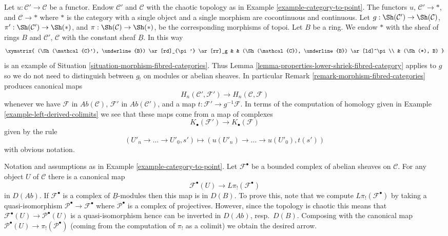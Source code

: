 \begin{example}
\label{example-morphism-categories}
Let $u : \mathcal{C}' \to \mathcal{C}$ be a functor.
Endow $\mathcal{C}'$ and $\mathcal{C}$ with the chaotic
topology as in Example \ref{example-category-to-point}.
The functors $u$, $\mathcal{C}' \to *$, and $\mathcal{C} \to *$
where $*$ is the category with a single object and a single morphism
are cocontinuous and continuous. Let
$g : \Sh(\mathcal{C}') \to \Sh(\mathcal{C})$,
$\pi' : \Sh(\mathcal{C}') \to \Sh(*)$, and
$\pi : \Sh(\mathcal{C}) \to \Sh(*)$,
be the corresponding morphisms of topoi.
Let $B$ be a ring. We endow $*$ with the sheaf of rings $B$ and
$\mathcal{C}'$, $\mathcal{C}$ with the constant sheaf $\underline{B}$.
In this way
$$
\xymatrix{
(\Sh(\mathcal{C}'), \underline{B}) \ar[rd]_{\pi'} \ar[rr]_g & &
(\Sh(\mathcal{C}), \underline{B}) \ar[ld]^\pi \\
& (\Sh(*), B)
}
$$
is an example of Situation \ref{situation-morphism-fibred-categories}.
Thus
Lemma \ref{lemma-properties-lower-shriek-fibred-category}
applies to $g$ so we do not need to distinguish between $g_!$ on
modules or abelian sheaves. In particular
Remark \ref{remark-morphism-fibred-categories}
produces canonical maps
$$
H_n(\mathcal{C}', \mathcal{F}')
\longrightarrow
H_n(\mathcal{C}, \mathcal{F})
$$
whenever we have $\mathcal{F}$ in $\textit{Ab}(\mathcal{C})$,
$\mathcal{F}'$ in $\textit{Ab}(\mathcal{C}')$,
and a map $t : \mathcal{F}' \to g^{-1}\mathcal{F}$. In terms of the
computation of homology given in
Example \ref{example-left-derived-colimits}
we see that these maps come from a map of complexes
$$
K_\bullet(\mathcal{F}') \longrightarrow K_\bullet(\mathcal{F})
$$
given by the rule
$$
(U'_n \to \ldots \to U'_0, s') \longmapsto
(u(U'_n) \to \ldots \to u(U'_0), t(s'))
$$
with obvious notation.
\end{example}

\begin{remark}
\label{remark-map-evaluation-to-derived}
Notation and assumptions as in Example \ref{example-category-to-point}.
Let $\mathcal{F}^\bullet$ be a bounded complex of abelian sheaves on
$\mathcal{C}$. For any object $U$ of $\mathcal{C}$ there is a canonical
map
$$
\mathcal{F}^\bullet(U) \longrightarrow L\pi_!(\mathcal{F}^\bullet)
$$
in $D(\textit{Ab})$. If $\mathcal{F}^\bullet$ is a complex of
$\underline{B}$-modules then this map is in $D(B)$. To prove this, note
that we compute $L\pi_!(\mathcal{F}^\bullet)$ by taking a quasi-isomorphism
$\mathcal{P}^\bullet \to \mathcal{F}^\bullet$ where $\mathcal{P}^\bullet$
is a complex of projectives. However, since the topology is chaotic
this means that $\mathcal{F}^\bullet(U) \to \mathcal{P}^\bullet(U)$
is a quasi-isomorphism hence can be inverted in
$D(\textit{Ab})$, resp.\ $D(B)$. Composing with the canonical map
$\mathcal{P}^\bullet(U) \to \pi_!(\mathcal{P}^\bullet)$ (coming from
the computation of $\pi_!$ as a colimit) we obtain the desired arrow.
\end{remark}

